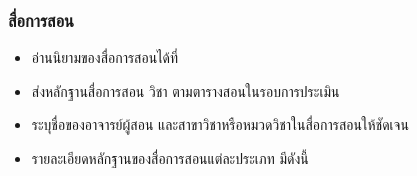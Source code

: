 \documentclass[a4paper,12pt,english]{sphinxmanual}
\begin{document}
\subsubsection{สื่อการสอน}
\label{\detokenize{submission_part1:id5}}\begin{itemize}
\item {} 
อ่านนิยามของสื่อการสอนได้ที่ {\hyperref[\detokenize{glossary:term-4}]{}}

\item {} 
ส่งหลักฐานสื่อการสอน  วิชา ตามตารางสอนในรอบการประเมิน

\item {} 
ระบุชื่อของอาจารย์ผู้สอน และสาขาวิชาหรือหมวดวิชาในสื่อการสอนให้ชัดเจน

\item {} 
รายละเอียดหลักฐานของสื่อการสอนแต่ละประเภท มีดังนี้

\end{itemize}
\end{document}
